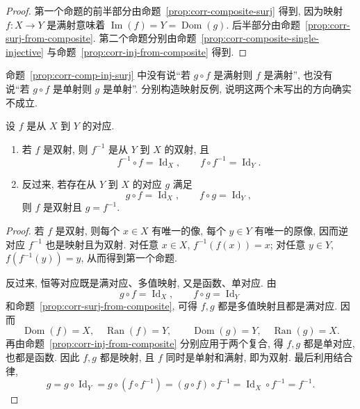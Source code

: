 \documentclass[usesamecnt, thmcnt=section, lang=cn, newtx, 10pt, scheme=chinese]{elegantbook}
\begin{document}
\begin{proof}
第一个命题的前半部分由命题~\ref{prop:corr-composite-surj} 得到, 因为映射 $f:X\to Y$ 是满射意味着 $\operatorname{Im}(f)=Y=\operatorname{Dom}(g)$. 后半部分由命题~\ref{prop:corr-surj-from-composite}. 第二个命题分别由命题~\ref{prop:corr-composite-single-injective} 与命题~\ref{prop:corr-inj-from-composite} 得到.
\end{proof}

\begin{exercise}\label{ex:corr-comp-inj-surj}
命题~\ref{prop:corr-comp-inj-surj} 中没有说``若 $g\circ f$ 是满射则 $f$ 是满射'', 也没有说``若 $g\circ f$ 是单射则 $g$ 是单射''. 分别构造映射反例, 说明这两个未写出的方向确实不成立.
\end{exercise}

\begin{proposition}\label{prop:corr-bijection-inverse}
设 $f$ 是从 $X$ 到 $Y$ 的对应.
\begin{enumerate}[label=\rm(\arabic*)]
  \item 若 $f$ 是双射, 则 $f^{-1}$ 是从 $Y$ 到 $X$ 的双射, 且
  \[
   f^{-1}\circ f=\operatorname{Id}_X,
   \qquad
   f\circ f^{-1}=\operatorname{Id}_Y.
  \]
  \item 反过来, 若存在从 $Y$ 到 $X$ 的对应 $g$ 满足
  \[
   g\circ f=\operatorname{Id}_X,
   \qquad
   f\circ g=\operatorname{Id}_Y,
  \]
  则 $f$ 是双射且 $g=f^{-1}$.
\end{enumerate}
\end{proposition}

\begin{proof}
若 $f$ 是双射, 则每个 $x\in X$ 有唯一的像, 每个 $y\in Y$ 有唯一的原像, 因而逆对应 $f^{-1}$ 也是映射且为双射. 对任意 $x\in X$, $f^{-1}(f(x))=x$; 对任意 $y\in Y$, $f(f^{-1}(y))=y$, 从而得到第一个命题.

反过来, 恒等对应既是满对应、多值映射, 又是函数、单对应. 由
\[
 g\circ f=\operatorname{Id}_X,
 \qquad
 f\circ g=\operatorname{Id}_Y
\]
和命题~\ref{prop:corr-surj-from-composite}, 可得 $f,g$ 都是多值映射且都是满对应. 因而
\[
 \operatorname{Dom}(f)=X,\quad \operatorname{Ran}(f)=Y,
 \qquad
 \operatorname{Dom}(g)=Y,\quad \operatorname{Ran}(g)=X.
\]
再由命题~\ref{prop:corr-inj-from-composite} 分别应用于两个复合, 得 $f,g$ 都是单对应, 也都是函数. 因此 $f,g$ 都是映射, 且 $f$ 同时是单射和满射, 即为双射. 最后利用结合律,
\[
 g=g\circ\operatorname{Id}_Y
 =g\circ(f\circ f^{-1})
 =(g\circ f)\circ f^{-1}
 =\operatorname{Id}_X\circ f^{-1}=f^{-1}.
\]
\end{proof}
\end{document}
